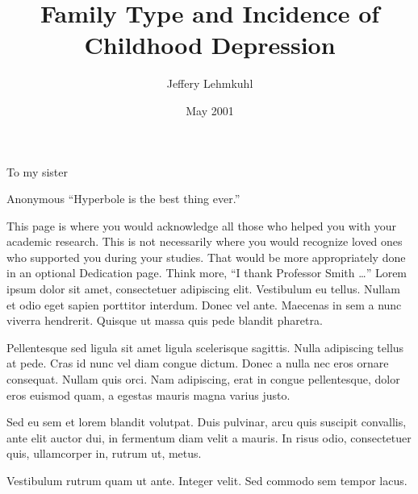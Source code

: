 \documentclass{MUthesis}
\title{Family Type and Incidence of Childhood Depression}
\author{Jeffery Lehmkuhl}
\date{May 2001} %
\begin{document}
\frontmatter   %
\maketitle     %
\copyrightpage %
\approvalpage  %

\begin{dedication}
  To my sister
\end{dedication}

\begin{epigraph}{Anonymous}
``Hyperbole is the best thing ever.''
\end{epigraph}

\begin{acknowledgments}
This page is where you would acknowledge all those who helped you with your
academic research. This is not necessarily where you would recognize loved ones
who supported you during your studies. That would be more appropriately done in
an optional Dedication page. Think more, ``I thank Professor Smith \dots''
Lorem ipsum dolor sit amet, consectetuer adipiscing elit. Vestibulum eu tellus.
Nullam et odio eget sapien porttitor interdum. Donec vel ante. Maecenas in sem
a nunc viverra hendrerit. Quisque ut massa quis pede blandit pharetra.

Pellentesque sed ligula sit amet ligula scelerisque sagittis. Nulla adipiscing
tellus at pede. Cras id nunc vel diam congue dictum. Donec a nulla nec eros
ornare consequat. Nullam quis orci. Nam adipiscing, erat in congue
pellentesque, dolor eros euismod quam, a egestas mauris magna varius justo.

Sed eu sem et lorem blandit volutpat. Duis pulvinar, arcu quis suscipit
convallis, ante elit auctor dui, in fermentum diam velit a mauris. In risus
odio, consectetuer quis, ullamcorper in, rutrum ut, metus.

Vestibulum rutrum quam ut ante. Integer velit. Sed commodo sem tempor lacus.
\end{acknowledgments}

\tableofcontents
\listoftables
\listoffigures
\end{document}
